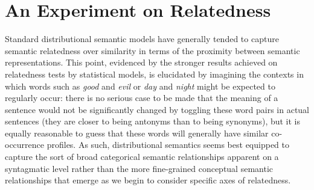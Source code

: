 \section{An Experiment on Relatedness}
Standard distributional semantic models have generally tended to capture semantic relatedness over similarity in terms of the proximity between semantic representations.  This point, evidenced by the stronger results achieved on relatedness tests by statistical models, is elucidated by imagining the contexts in which words such as \emph{good} and \emph{evil} or \emph{day} and \emph{night} might be expected to regularly occur: there is no serious case to be made that the meaning of a sentence would not be significantly changed by toggling these word pairs in actual sentences (they are closer to being antonyms than to being synonyms), but it is equally reasonable to guess that these words will generally have similar co-occurrence profiles.  As such, distributional semantics seems best equipped to capture the sort of broad categorical semantic relationships apparent on a syntagmatic level rather than the more fine-grained conceptual semantic relationships that emerge as we begin to consider specific axes of relatedness.

